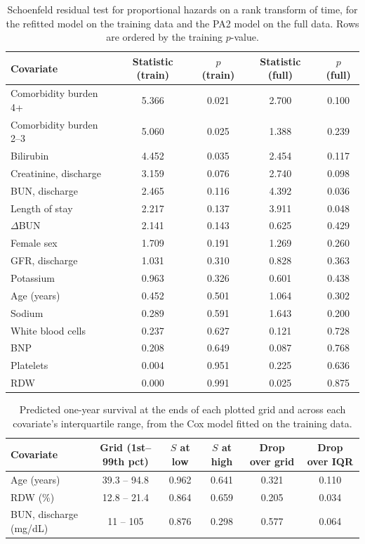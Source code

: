 \documentclass[11pt,a4paper]{article}
\newcommand{\dbun}{$\Delta$BUN}
\begin{document}
\begin{table}[H]
\centering
\caption{Schoenfeld residual test for proportional hazards on a rank
transform of time, for the refitted model on the training data and the PA2 model on the full
data. Rows are ordered by the training $p$-value.}
\label{tab:ph}
\vspace{0.3em}
\small
\begin{tabular}{lcccc}
\toprule
Covariate & Statistic (train) & $p$ (train) & Statistic (full) & $p$ (full) \\
\midrule
Comorbidity burden 4+   & 5.366 & 0.021 & 2.700 & 0.100 \\
Comorbidity burden 2--3 & 5.060 & 0.025 & 1.388 & 0.239 \\
Bilirubin               & 4.452 & 0.035 & 2.454 & 0.117 \\
Creatinine, discharge   & 3.159 & 0.076 & 2.740 & 0.098 \\
BUN, discharge          & 2.465 & 0.116 & 4.392 & 0.036 \\
Length of stay          & 2.217 & 0.137 & 3.911 & 0.048 \\
\dbun{}                 & 2.141 & 0.143 & 0.625 & 0.429 \\
Female sex              & 1.709 & 0.191 & 1.269 & 0.260 \\
GFR, discharge          & 1.031 & 0.310 & 0.828 & 0.363 \\
Potassium               & 0.963 & 0.326 & 0.601 & 0.438 \\
Age (years)             & 0.452 & 0.501 & 1.064 & 0.302 \\
Sodium                  & 0.289 & 0.591 & 1.643 & 0.200 \\
White blood cells       & 0.237 & 0.627 & 0.121 & 0.728 \\
BNP                     & 0.208 & 0.649 & 0.087 & 0.768 \\
Platelets               & 0.004 & 0.951 & 0.225 & 0.636 \\
RDW                     & 0.000 & 0.991 & 0.025 & 0.875 \\
\bottomrule
\end{tabular}
\end{table}

\begin{table}[H]
\centering
\caption{Predicted one-year survival at the ends of each plotted grid and
across each covariate's interquartile range, from the Cox model fitted on the training data.}
\label{tab:coxpred}
\vspace{0.3em}
\footnotesize
\begin{tabular}{lccccc}
\toprule
Covariate & Grid (1st--99th pct) & $S$ at low & $S$ at high & Drop over grid & Drop over IQR \\
\midrule
Age (years)             & 39.3 -- 94.8 & 0.962 & 0.641 & 0.321 & 0.110 \\
RDW (\%)                & 12.8 -- 21.4 & 0.864 & 0.659 & 0.205 & 0.034 \\
BUN, discharge (mg/dL)  & 11 -- 105    & 0.876 & 0.298 & 0.577 & 0.064 \\
\bottomrule
\end{tabular}
\end{table}
\end{document}
